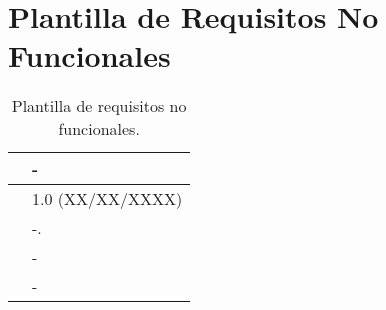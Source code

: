\section{Plantilla de Requisitos No Funcionales}

\begin{table}[H]
\begin{center}
\begin{tabular}{|p{3cm}|p{10cm}|} \hline
\centering {\bf NFR-XX} & -  \\ \hline\hline
\centering {\bf Versión} & 1.0 (XX/XX/XXXX) \\ \hline
\centering {\bf Descripción} &  -. \\ \hline
\centering {\bf Importancia} & - \\ \hline
\centering {\bf Urgencia} & - \\ \hline
\end{tabular}
\caption{Plantilla de requisitos no funcionales.}
\label{enlaceNFRX}
\end{center}
\end{table}